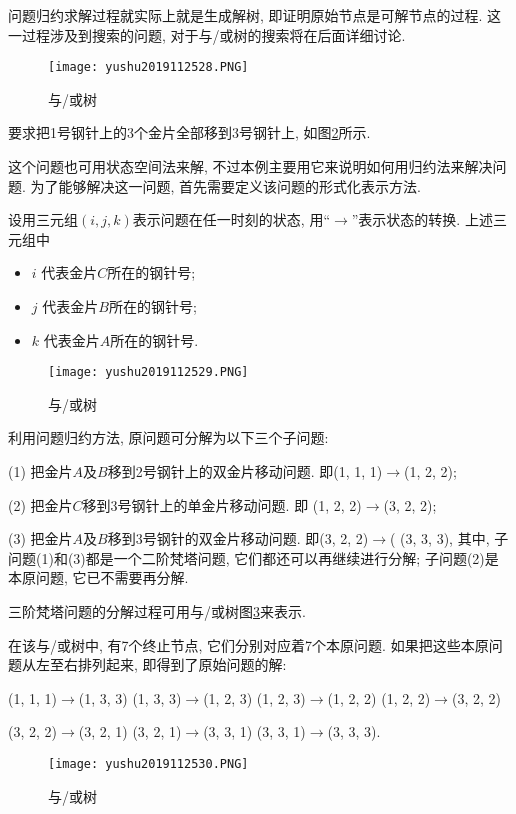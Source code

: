 问题归约求解过程就实际上就是生成解树, 即证明原始节点是可解节点的过程. 这一过程涉及到搜索的问题, 对于与/或树的搜索将在后面详细讨论.
\begin{figure}[H]
\centering
\texttt{[image: yushu2019112528.PNG]}
\caption{与/或树 }
\label{AI32fig28}
\end{figure}
\begin{example}
   要求把1号钢针上的3个金片全部移到3号钢针上, 如图\ref{AI32fig29}所示.
\end{example}
\begin{answer}
这个问题也可用状态空间法来解, 不过本例主要用它来说明如何用归约法来解决问题.
为了能够解决这一问题, 首先需要定义该问题的形式化表示方法.

设用三元组$(i, j, k)$表示问题在任一时刻的状态, 用“$\rightarrow$”表示状态的转换. 上述三元组中
\begin{itemize}
\item $i$ 代表金片$C$所在的钢针号;
\item $j$ 代表金片$B$所在的钢针号;
\item $k$ 代表金片$A$所在的钢针号.
\end{itemize}
\begin{figure}[H]
\centering
\texttt{[image: yushu2019112529.PNG]}
\caption{与/或树 }
\label{AI32fig29}
\end{figure}
利用问题归约方法, 原问题可分解为以下三个子问题:

(1) 把金片$A$及$B$移到2号钢针上的双金片移动问题. 即(1, 1, 1)$\rightarrow$(1, 2, 2);

(2) 把金片$C$移到3号钢针上的单金片移动问题. 即 (1, 2, 2)$\rightarrow$(3, 2, 2);

(3) 把金片$A$及$B$移到3号钢针的双金片移动问题. 即(3, 2, 2)$\rightarrow$( (3, 3, 3),
其中, 子问题(1)和(3)都是一个二阶梵塔问题, 它们都还可以再继续进行分解; 子问题(2)是本原问题, 它已不需要再分解.

三阶梵塔问题的分解过程可用与/或树图\ref{AI32fig2019120230}来表示.

在该与/或树中, 有7个终止节点, 它们分别对应着7个本原问题. 如果把这些本原问题从左至右排列起来, 即得到了原始问题的解:

(1, 1, 1)$\rightarrow$(1, 3, 3)    (1, 3, 3)$\rightarrow$(1, 2, 3)    (1, 2, 3)$\rightarrow$(1, 2, 2)   (1, 2, 2)$\rightarrow$(3, 2, 2)

(3, 2, 2)$\rightarrow$(3, 2, 1)    (3, 2, 1)$\rightarrow$(3, 3, 1)   (3, 3, 1)$\rightarrow$(3, 3, 3).
\begin{figure}[H]
\centering
\texttt{[image: yushu2019112530.PNG]}
\caption{与/或树 }
\label{AI32fig2019120230}
\end{figure}
\end{answer}
